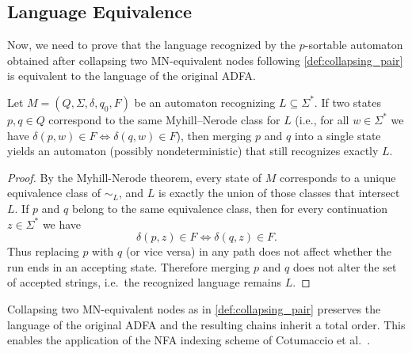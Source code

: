 \subsection{Language Equivalence}
Now, we need to prove that the language recognized by the $p$-sortable automaton obtained after collapsing two MN-equivalent nodes following \cref{def:collapsing_pair} is equivalent to the language of the original ADFA.

\begin{lemma}
Let $M=(Q,\Sigma,\delta,q_0,F)$ be an automaton recognizing $L \subseteq \Sigma^*$.
If two states $p,q \in Q$ correspond to the same Myhill--Nerode class for $L$ (i.e., for all $w\in\Sigma^*$ we have $\delta(p,w)\in F \iff \delta(q,w)\in F$), then merging $p$ and $q$ into a single state yields an automaton (possibly nondeterministic) that still recognizes exactly $L$.
\end{lemma}

\begin{proof}
By the Myhill-Nerode theorem, every state of $M$ corresponds to a unique equivalence class of $\sim_L$, and $L$ is exactly the union of those classes that intersect $L$.
If $p$ and $q$ belong to the same equivalence class, then for every continuation $z \in \Sigma^*$ we have
\[
\delta(p,z) \in F \iff \delta(q,z) \in F.
\]
Thus replacing $p$ with $q$ (or vice versa) in any path does not affect whether the run ends in an accepting state. Therefore merging $p$ and $q$ does not alter the set of accepted strings, i.e.\ the recognized language remains $L$.
\end{proof} 

Collapsing two MN-equivalent nodes as in \cref{def:collapsing_pair} preserves the language of the original ADFA and the resulting chains inherit a total order. This enables the application of the NFA indexing scheme of Cotumaccio et al.~\cite{cotumaccio2023co}.